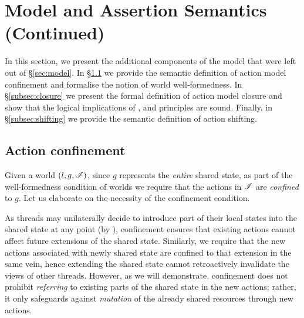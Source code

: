 \section{\colosl Model and Assertion Semantics (Continued)}\label{chapter:logic}
In this section, we present the additional components of the \colosl model that were left out of \S\ref{sec:model}. In \S\ref{subsec:confinement} we provide the semantic definition of action model confinement and formalise the notion of world well-formedness. In \S\ref{subsec:closure} we present the formal definition of action model closure and show that the logical implications of \copyRule, \forgetRule and \mergeRule principles are sound. Finally, in \S\ref{subsec:shifting} we provide the semantic definition of action shifting. 
%
%
\subsection{Action confinement}\label{subsec:confinement}
Given a world $(l, g, \mathscr{I})$, since $g$ represents the \emph{entire} shared state, as part of the well-formedness condition of worlds we require that the actions in $\mathscr{I}$ are \emph{confined} to $g$.  
Let us elaborate on the necessity of the confinement condition.

As threads may unilaterally decide to introduce part of their local states into the shared state at any point (by \extendRule), confinement ensures that existing actions cannot affect future extensions of the shared state. Similarly, we require that the new actions associated with newly shared state are confined to that extension in the same vein, hence extending the shared state cannot retroactively invalidate the views of other threads. However, as we will demonstrate, confinement does not prohibit \emph{referring} to existing parts of the shared state in the new actions; rather, it only safeguards against \emph{mutation} of the already shared resources through new actions.

